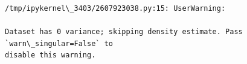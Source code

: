 \documentclass[11pt]{article}
\begin{document}
    \begin{center}
    \end{center}
    { \hspace*{\fill} \\}
    
    \begin{center}
    \end{center}
    { \hspace*{\fill} \\}
    
    \begin{center}
    \end{center}
    { \hspace*{\fill} \\}
    
    \begin{Verbatim}[commandchars=\\\{\}]
/tmp/ipykernel\_3403/2607923038.py:15: UserWarning:

Dataset has 0 variance; skipping density estimate. Pass `warn\_singular=False` to
disable this warning.

    \end{Verbatim}

    \begin{center}
    \end{center}
    { \hspace*{\fill} \\}
    
    \begin{center}
    \end{center}
    { \hspace*{\fill} \\}
    
    \begin{center}
    \end{center}
    { \hspace*{\fill} \\}
    
    \begin{center}
    \end{center}
    { \hspace*{\fill} \\}
    
\end{document}
